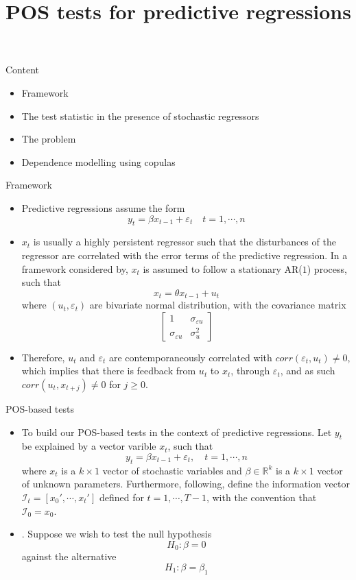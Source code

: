 \documentclass{beamer}
\title{POS tests for predictive regressions}
\begin{document}
\maketitle
\begin{frame}{Content}

\begin{itemize}
\item Framework 
\item The test statistic in the presence of stochastic regressors 
\item The problem
\item Dependence modelling using copulas
\end{itemize}

\end{frame}
\begin{frame}{Framework}
\begin{itemize}
\item{} Predictive regressions assume the form
\begin{equation}
y_t=\beta x_{t-1}+\varepsilon_t\quad t=1,\cdots,n
\end{equation}
 \item{} $x_t$ is usually a highly persistent regressor such that the disturbances of the regressor are correlated with the error terms of the predictive regression. In a framework considered by, $x_t$ is assumed to follow a stationary AR($1$) process, such that
\[
x_t=\theta x_{t-1}+u_t
\]
where $(u_t,\varepsilon_t)$ are bivariate normal distribution, with the covariance matrix
\[
\begin{bmatrix}
1&\sigma_{\varepsilon u}\\
\sigma_{\varepsilon u}&\sigma^2_u
\end{bmatrix}
\] 
\item{} Therefore, $u_t$ and $\varepsilon_t$ are contemporaneously correlated with $corr(\varepsilon_t,u_t)\neq 0$, which implies that there is feedback from $u_t$ to $x_t$, through $\varepsilon_t$, and as such $corr(u_t,x_{t+j})\neq0$ for $j\geq 0$.
\end{itemize}
\end{frame}
\begin{frame}{POS-based tests}
\begin{itemize}
\item{}To build our POS-based tests in the context of predictive regressions. Let $y_t$ be explained by a vector varible $x_t$, such that
\begin{equation}\label{eq: model}
y_t=\beta x_{t-1}+\varepsilon_t,\quad t=1,\cdots,n
\end{equation}
where $x_t$ is a $k\times 1$ vector of stochastic variables and $\beta\in \mathbb{R}^k$ is a $k\times 1$ vector of unknown parameters. Furthermore, following, define the information vector $\mathcal{I}_{t}=[x_0',\cdots,x_t']$ defined for $t=1,\cdots,T-1$, with the convention that $\mathcal{I}_0=x_0$.
\item{}. Suppose we wish to test the null hypothesis
\[
H_0:\beta=0
\] 
against the alternative
\[
H_1: \beta=\beta_1
\]
\end{itemize}
\end{frame}
\end{document}
